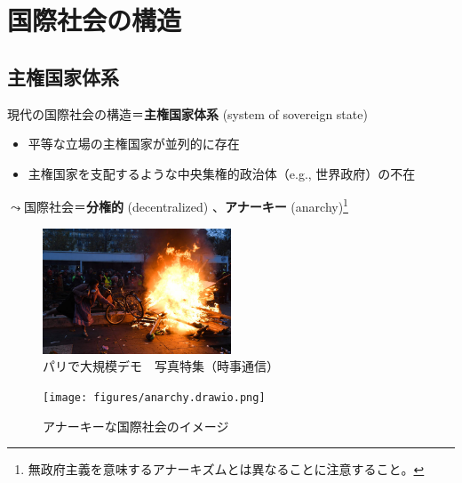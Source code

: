 \documentclass[
  xelatex,
  ja=standard]{bxjsarticle}
\providecommand{\tightlist}{%
  \setlength{\itemsep}{0pt}\setlength{\parskip}{0pt}}\usepackage{longtable,booktabs,array}
\begin{document}
\hypertarget{ux56fdux969bux793eux4f1aux306eux69cbux9020}{%
\section{国際社会の構造}\label{ux56fdux969bux793eux4f1aux306eux69cbux9020}}

\hypertarget{ux4e3bux6a29ux56fdux5bb6ux4f53ux7cfb}{%
\subsection{主権国家体系}\label{ux4e3bux6a29ux56fdux5bb6ux4f53ux7cfb}}

現代の国際社会の構造＝\textbf{主権国家体系} (system of sovereign state)

\begin{itemize}
\tightlist
\item
  平等な立場の主権国家が並列的に存在
\item
  主権国家を支配するような中央集権的政治体（e.g., 世界政府）の不在
\end{itemize}

\(\leadsto\)国際社会＝\textbf{分権的} (decentralized)
、\textbf{アナーキー} (anarchy)\footnote{無政府主義を意味するアナーキズムとは異なることに注意すること。}

\begin{figure}[htpb]

{\centering \includegraphics[width=0.5\textwidth,height=\textheight]{international_society_files/mediabag/pmb805-jpp033367028.jpg}

}

\caption{パリで大規模デモ　写真特集（時事通信）}

\end{figure}

\begin{figure}[htpb]

{\centering \texttt{[image: figures/anarchy.drawio.png]}

}

\caption{アナーキーな国際社会のイメージ}

\end{figure}
\end{document}
